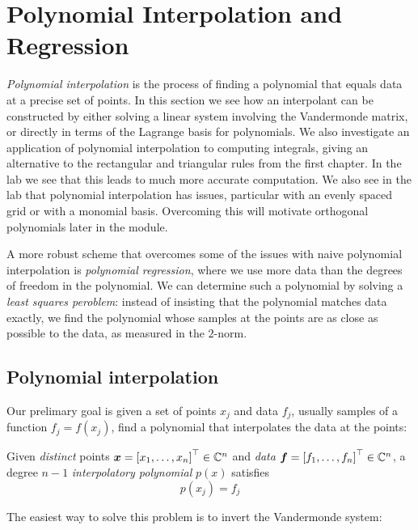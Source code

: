 
\section{Polynomial Interpolation and Regression}
\emph{Polynomial interpolation} is the process of finding a polynomial that equals data at a precise set of points. In this section we see how an interpolant can be constructed by either solving a linear system involving the Vandermonde matrix, or directly in terms of the Lagrange basis for polynomials. We also investigate an application of polynomial interpolation to computing integrals, giving an alternative to the rectangular and triangular rules from the first chapter. In the lab we see that this leads to much more accurate computation. We also see in the lab that polynomial interpolation has issues, particular with an evenly spaced grid or with a monomial basis. Overcoming this will motivate orthogonal polynomials later in the module.

A more robust scheme that overcomes some of the issues with naive polynomial interpolation is \emph{polynomial regression}, where we use more data than the degrees of freedom in the polynomial. We can determine such a polynomial by solving a \emph{least squares peroblem}: instead of insisting that the polynomial matches data exactly, we find the polynomial whose samples at the points are as close as possible to the data, as measured in the $2$-norm. 

\subsection{Polynomial interpolation}
Our prelimary goal is given a set of points $x_j$ and data $f_j$, usually samples of a function $f_j = f(x_j)$, find a polynomial that interpolates the data at the points:

\begin{definition} Given \emph{distinct} points $\ensuremath{\bm{\x}} = \vectt[x_1,\ensuremath{\ldots},x_n] \ensuremath{\in} \ensuremath{\bbC} ^n$ and \emph{data} $\ensuremath{\bm{\f}} = \vectt[f_1,\ensuremath{\ldots},f_n] \ensuremath{\in} \ensuremath{\bbC}^n$, a degree $n-1$ \emph{interpolatory polynomial} $p(x)$ satisfies
\[
p(x_j) = f_j
\]
\end{definition}

The easiest way to solve this problem is to invert the Vandermonde system:

